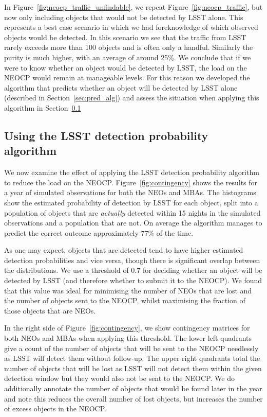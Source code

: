 \documentclass[twocolumn]{aastex631}
\begin{document}
In Figure~\ref{fig:neocp_traffic_unfindable}, we repeat Figure~\ref{fig:neocp_traffic}, but now only including objects that would not be detected by LSST alone. This represents a best case scenario in which we had foreknowledge of which observed objects would be detected. In this scenario we see that the traffic from LSST rarely exceeds more than 100 objects and is often only a handful. Similarly the purity is much higher, with an average of around 25\%. We conclude that if we were to know whether an object would be detected by LSST, the load on the NEOCP would remain at manageable levels. For this reason we developed the algorithm that predicts whether an object will be detected by LSST alone (described in Section~\ref{sec:pred_alg}) and assess the situation when applying this algorithm in Section~\ref{sec:using_alg}

\subsection{Using the LSST detection probability algorithm}\label{sec:using_alg}
We now examine the effect of applying the LSST detection probability algorithm to reduce the load on the NEOCP. Figure~\ref{fig:contingency} shows the results for a year of simulated observations for both the NEOs and MBAs. The histograms show the estimated probability of detection by LSST for each object, split into a population of objects that are \textit{actually} detected within 15 nights in the simulated observations and a population that are not. On average the algorithm manages to predict the correct outcome approximately $77\%$ of the time.

As one may expect, objects that are detected tend to have higher estimated detection probabilities and vice versa, though there is significant overlap between the distributions. We use a threshold of 0.7 for deciding whether an object will be detected by LSST (and therefore whether to submit it to the NEOCP). We found that this value was ideal for minimising the number of NEOs that are lost and the number of objects sent to the NEOCP, whilst maximising the fraction of those objects that are NEOs.

In the right side of Figure~\ref{fig:contingency}, we show contingency matrices for both NEOs and MBAs when applying this threshold. The lower left quadrants give a count of the number of objects that will be sent to the NEOCP needlessly as LSST will detect them without follow-up. The upper right quadrants total the number of objects that will be lost as LSST will not detect them within the given detection window but they would also not be sent to the NEOCP. We do additionally annotate the number of objects that would be found later in the year and note this reduces the overall number of lost objects, but increases the number of excess objects in the NEOCP.
\end{document}

